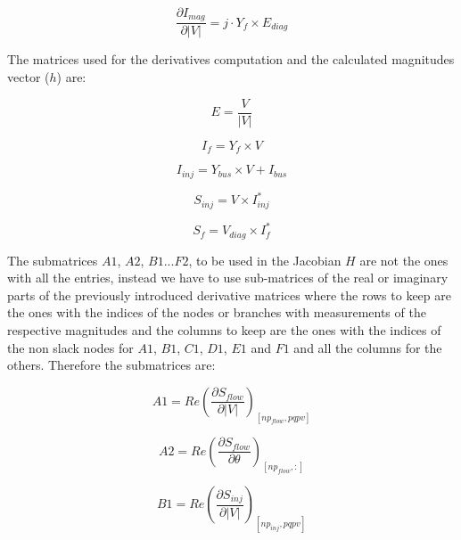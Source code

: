 \documentclass[a4paper,twoside,fleqn]{tufte-book}
\begin{document}
\begin{equation}\frac{\partial I_{mag}}{\partial |V|}=j \cdot Y_f \times E_{diag} 
\end{equation}

The matrices used for the derivatives computation and the calculated magnitudes vector ($h$) are:

\begin{equation}E=\frac{V}{|V|}\end{equation}  

\begin{equation}
I_f=Y_f \times V 
\label{eq:current_from}
\end{equation}

\begin{equation}
I_{inj}=Y_{bus}  \times  V + I_{bus}
\label{eq:current_inj}
\end{equation}

\begin{equation}
S_{inj} = V  \times  I_{inj}^*
\label{eq:power_injection}
\end{equation}

\begin{equation}
S_f = V_{diag} \times I_{f}^*
\label{eq:power_from}
\end{equation}

The submatrices $A1$, $A2$, $B1$...$F2$, to be used in the Jacobian $H$ are not the ones with all the entries, instead we have to use sub-matrices of the real or imaginary parts of the previously introduced derivative matrices where the rows to keep are the ones with the indices of the nodes or branches with measurements of the respective magnitudes and the columns to keep are the ones with the indices of the non slack nodes for $A1$, $B1$, $C1$, $D1$, $E1$ and $F1$ and all the columns for the others. Therefore the submatrices are:

\begin{equation}
A1 = Re\left(\frac{\partial S_{flow}}{\partial |V|}\right)_{[np_{flow}, pqpv]}
\end{equation}

\begin{equation}
A2 = Re\left(\frac{\partial S_{flow}}{\partial \theta}\right)_{[np_{flow}, :]}
\end{equation}

\begin{equation}
B1 = Re\left(\frac{\partial S_{inj}}{\partial |V|}\right)_{[np_{inj}, pqpv]}
\end{equation}
\end{document}
